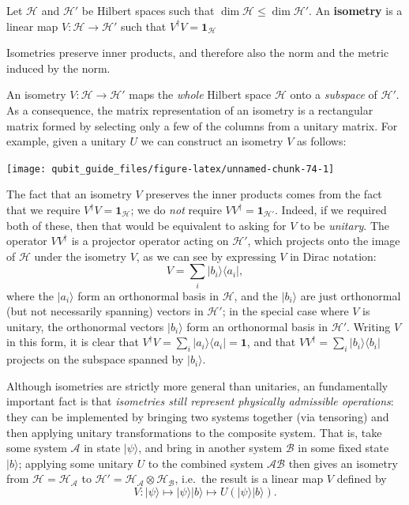 \documentclass[fleqn,a4paper]{article}
\newenvironment{idea}{\everypar{\setlength{\parindent}{1.5em}}}{}
\theoremstyle{definition}
\theoremstyle{definition}
\theoremstyle{definition}
\theoremstyle{definition}
\theoremstyle{remark}
\begin{document}
\begin{idea}
Let \(\mathcal{H}\) and \(\mathcal{H}'\) be Hilbert spaces such that \(\dim\mathcal{H}\leqslant\dim\mathcal{H}'\).
An \textbf{isometry} is a linear map \(V\colon\mathcal{H}\to\mathcal{H}'\) such that \(V^\dagger V=\mathbf{1}_{\mathcal{H}}\)

Isometries preserve inner products, and therefore also the norm and the metric induced by the norm.

\end{idea}

An isometry \(V\colon\mathcal{H}\to\mathcal{H}'\) maps the \emph{whole} Hilbert space \(\mathcal{H}\) onto a \emph{subspace} of \(\mathcal{H}'\).
As a consequence, the matrix representation of an isometry is a rectangular matrix formed by selecting only a few of the columns from a unitary matrix.
For example, given a unitary \(U\) we can construct an isometry \(V\) as follows:

\begin{center}\texttt{[image: qubit\_guide\_files/figure-latex/unnamed-chunk-74-1]} \end{center}

The fact that an isometry \(V\) preserves the inner products comes from the fact that we require \(V^\dagger V=\mathbf{1}_{\mathcal{H}}\);
we do \emph{not} require \(VV^\dagger=\mathbf{1}_{\mathcal{H'}}\).
Indeed, if we required both of these, then that would be equivalent to asking for \(V\) to be \emph{unitary}.
The operator \(VV^\dagger\) is a projector operator acting on \(\mathcal{H}'\), which projects onto the image of \(\mathcal{H}\) under the isometry \(V\), as we can see by expressing \(V\) in Dirac notation:
\[
  V = \sum_i |b_i\rangle\langle a_i|,
\]
where the \(|a_i\rangle\) form an orthonormal basis in \(\mathcal{H}\), and the \(|b_i\rangle\) are just orthonormal (but not necessarily spanning) vectors in \(\mathcal{H}'\);
in the special case where \(V\) is unitary, the orthonormal vectors \(|b_i\rangle\) form an orthonormal basis in \(\mathcal{H}'\).
Writing \(V\) in this form, it is clear that \(V^\dagger V=\sum_i |a_i\rangle\langle a_i|=\mathbf{1}\), and that \(VV^\dagger = \sum_i |b_i\rangle\langle b_i|\) projects on the subspace spanned by \(|b_i\rangle\).

Although isometries are strictly more general than unitaries, an fundamentally important fact is that \emph{isometries still represent physically admissible operations}: they can be implemented by bringing two systems together (via tensoring) and then applying unitary transformations to the composite system.
That is, take some system \(\mathcal{A}\) in state \(|\psi\rangle\), and bring in another system \(\mathcal{B}\) in some fixed state \(|b\rangle\);
applying some unitary \(U\) to the combined system \(\mathcal{A}\mathcal{B}\) then gives an isometry from \(\mathcal{H}=\mathcal{H}_\mathcal{A}\) to \(\mathcal{H}'=\mathcal{H}_\mathcal{A}\otimes\mathcal{H}_\mathcal{B}\), i.e.~the result is a linear map \(V\) defined by
\[
  V\colon
  |\psi\rangle
  \longmapsto
  |\psi\rangle|b\rangle
  \longmapsto
  U(|\psi\rangle|b\rangle).
\]
\end{document}
